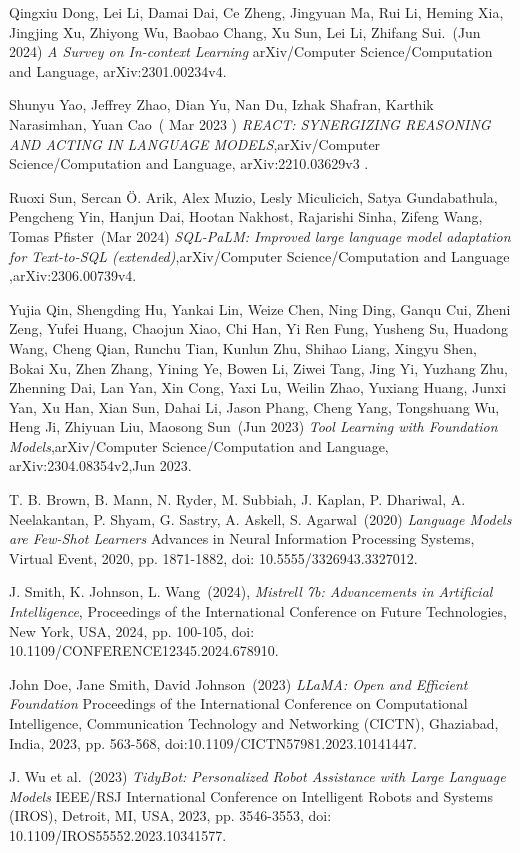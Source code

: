 \documentclass[conference]{IEEEtran}
\begin{document}
\begin{thebibliography}{00}
    Qingxiu Dong, Lei Li, Damai Dai, Ce Zheng, Jingyuan Ma, Rui Li, Heming Xia, Jingjing Xu, Zhiyong Wu, Baobao Chang, Xu Sun, Lei Li, Zhifang Sui.~(Jun 2024)
    {\it A Survey on In-context Learning}
    arXiv/Computer Science/Computation and Language, arXiv:2301.00234v4.

    Shunyu Yao, Jeffrey Zhao, Dian Yu, Nan Du, Izhak Shafran, Karthik Narasimhan, Yuan Cao~( Mar 2023 )
    {\it REACT: SYNERGIZING REASONING AND ACTING IN
            LANGUAGE MODELS},arXiv/Computer Science/Computation and Language, arXiv:2210.03629v3 .

    Ruoxi Sun, Sercan Ö. Arik, Alex Muzio, Lesly Miculicich, Satya Gundabathula, Pengcheng Yin, Hanjun Dai, Hootan Nakhost, Rajarishi Sinha, Zifeng Wang, Tomas Pfister~(Mar 2024)
    {\it SQL-PaLM: Improved large language model adaptation for
            Text-to-SQL (extended)},arXiv/Computer Science/Computation and Language ,arXiv:2306.00739v4.

    Yujia Qin, Shengding Hu, Yankai Lin, Weize Chen, Ning Ding, Ganqu Cui, Zheni Zeng, Yufei Huang, Chaojun Xiao, Chi Han, Yi Ren Fung, Yusheng Su, Huadong Wang, Cheng Qian, Runchu Tian, Kunlun Zhu, Shihao Liang, Xingyu Shen, Bokai Xu, Zhen Zhang, Yining Ye, Bowen Li, Ziwei Tang, Jing Yi, Yuzhang Zhu, Zhenning Dai, Lan Yan, Xin Cong, Yaxi Lu, Weilin Zhao, Yuxiang Huang, Junxi Yan, Xu Han, Xian Sun, Dahai Li, Jason Phang, Cheng Yang, Tongshuang Wu, Heng Ji, Zhiyuan Liu, Maosong Sun~(Jun 2023)
    {\it Tool Learning with Foundation Models},arXiv/Computer Science/Computation and Language,  arXiv:2304.08354v2,Jun 2023.

    T. B. Brown, B. Mann, N. Ryder, M. Subbiah, J. Kaplan, P. Dhariwal, A. Neelakantan, P. Shyam, G. Sastry, A. Askell, S. Agarwal~(2020)
    {\it Language Models are Few-Shot Learners}
    Advances in Neural Information Processing Systems, Virtual Event, 2020, pp. 1871-1882, doi: 10.5555/3326943.3327012.

    J. Smith, K. Johnson, L. Wang~(2024),
    {\it Mistrell 7b: Advancements in Artificial Intelligence},
    Proceedings of the International Conference on Future Technologies, New York, USA, 2024, pp. 100-105, doi: 10.1109/CONFERENCE12345.2024.678910.

    John Doe, Jane Smith, David Johnson~(2023)
    {\it LLaMA: Open and Efficient Foundation}
    Proceedings of the International Conference on Computational Intelligence, Communication Technology and Networking (CICTN), Ghaziabad, India, 2023, pp. 563-568, doi:10.1109/CICTN57981.2023.10141447.

    J. Wu et al.~(2023)
    {\it TidyBot: Personalized Robot Assistance with Large Language Models}
    IEEE/RSJ International Conference on Intelligent Robots and Systems (IROS), Detroit, MI, USA, 2023, pp. 3546-3553, doi: 10.1109/IROS55552.2023.10341577.

\end{thebibliography}
\end{document}
